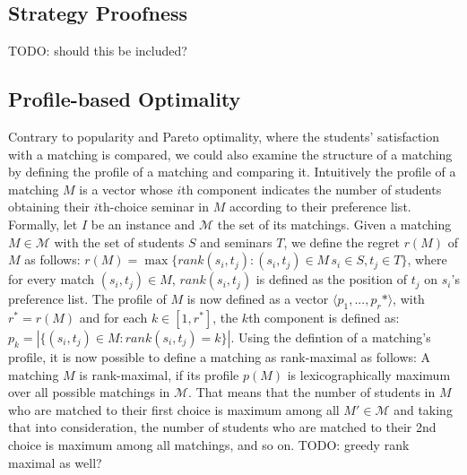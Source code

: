 \subsection{Strategy Proofness}
TODO: should this be included?

\subsection{Profile-based Optimality}
Contrary to popularity and Pareto optimality, where the students' satisfaction with a matching is compared, we could also examine the structure of a matching by defining the profile of a matching and comparing it. Intuitively the profile of a matching $M$ is a vector whose $i$th component indicates the number of students obtaining their $i$th-choice seminar in $M$ according to their preference list. 
\newline
Formally, let $I$ be an instance and $\mathcal{M}$ the set of its matchings. Given a matching $M \in \mathcal{M}$ with the set of students $S$ and seminars $T$, we define the regret $r(M)$ of $M$ as follows:
$r(M) = \max \{rank(s_i, t_j): (s_i, t_j)\in M\, s_i \in S, t_j \in T\}$, where for every match $(s_i, t_j) \in M$, $rank(s_i, t_j)$ is defined as the position of $t_j$ on $s_i$'s preference list. The profile of $M$ is now defined as a vector $\langle p_1,..., p_r* \rangle$, with $r^* = r(M)$ and for each $k \in [1,r^*]$, the $k$th component is defined as: $p_k=|\{(s_i, t_j) \in M: rank(s_i, t_j) = k\}|$.\cite{algorithmics}
\newline
Using the defintion of a matching's profile, it is now possible to define a matching as rank-maximal as follows: A matching $M$ is rank-maximal, if its profile $p(M)$ is lexicographically maximum over all possible matchings in $\mathcal{M}$. That means that the number of students in $M$ who are matched to their first choice is maximum among all $M' \in \mathcal{M}$ and taking that into consideration, the number of students who are matched to their 2nd choice is maximum among all matchings, and so on.
TODO: greedy rank maximal as well? 


